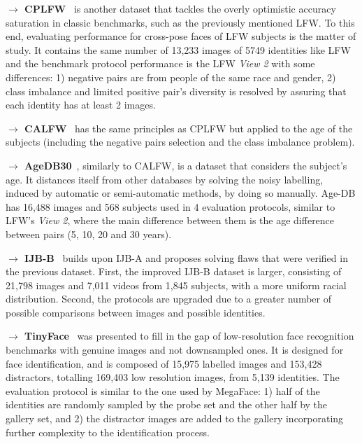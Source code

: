 \documentclass[class=report, crop=false, a4paper, 12pt]{standalone}
\begin{document}
\vspace{0.7\baselineskip}
\noindent\textbf{$\rightarrow$ CPLFW}~\autocite{zhengCrossPoseLFWDatabase} is another dataset that tackles the overly optimistic accuracy saturation in classic benchmarks, such as the previously mentioned LFW. To this end, evaluating performance for cross-pose faces of LFW subjects is the matter of study. It contains the same number of 13,233 images of 5749 identities like LFW and the benchmark protocol performance is the LFW \textit{View 2} with some differences: 1) negative pairs are from people of the same race and gender, 2) class imbalance and limited positive pair's diversity is resolved by assuring that each identity has at least 2 images.

\vspace{0.7\baselineskip}
\noindent\textbf{$\rightarrow$ CALFW}~\autocite{zhengCrossAgeLFWDatabase2017} has the same principles as CPLFW but applied to the age of the subjects (including the negative pairs selection and the class imbalance problem).

\vspace{0.7\baselineskip}
\noindent\textbf{$\rightarrow$ AgeDB30}~\autocite{moschoglouAgeDBFirstManually2017}, similarly to CALFW, is a dataset that considers the subject's age. It distances itself from other databases by solving the noisy labelling, induced by automatic or semi-automatic methods, by doing so manually. Age-DB has 16,488 images and 568 subjects used in 4 evaluation protocols, similar to LFW's \textit{View 2}, where the main difference between them is the age difference between pairs (5, 10, 20 and 30 years).

\vspace{0.7\baselineskip}
\noindent\textbf{$\rightarrow$ IJB-B}~\autocite{whitelamIARPAJanusBenchmarkB2017} builds upon IJB-A and proposes solving flaws that were verified in the previous dataset. First, the improved IJB-B dataset is larger, consisting of 21,798 images and 7,011 videos from 1,845 subjects, with a more uniform racial distribution. Second, the protocols are upgraded due to a greater number of possible comparisons between images and possible identities.

\vspace{0.7\baselineskip}
\noindent\textbf{$\rightarrow$ TinyFace}~\autocite{chengLowResolutionFaceRecognition2019} was presented to fill in the gap of low-resolution face recognition benchmarks with genuine images and not downsampled ones. It is designed for face identification, and is composed of 15,975 labelled images and 153,428 distractors, totalling 169,403 low resolution images, from 5,139 identities. The evaluation protocol is similar to the one used by MegaFace: 1) half of the identities are randomly sampled by the probe set and the other half by the gallery set, and 2) the distractor images are added to the gallery incorporating further complexity to the identification process.
\end{document}
